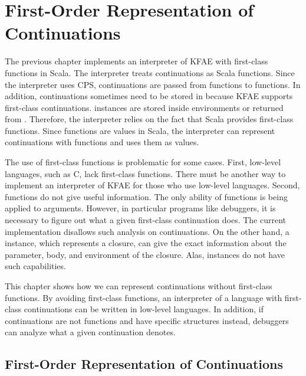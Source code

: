 \setchapterpreamble[u]{\margintoc}
\chapter{First-Order Representation of Continuations}

\renewcommand{\lang}{\textsf{KFAE}\xspace}

The previous chapter implements an interpreter of \lang with first-class
functions in Scala. The interpreter treats
continuations as Scala functions. Since the interpreter uses CPS, continuations
are passed from functions to functions. In addition, continuations sometimes need to be
stored in  because \lang supports first-class continuations.
 instances are stored inside environments or returned from
. Therefore, the interpreter relies on the fact that Scala provides
first-class functions. Since functions are values in Scala, the interpreter can
represent continuations with functions and uses them as values.

The use of first-class functions is problematic for some cases. First, low-level languages, such
as C, lack first-class functions. There must be
another way to implement an interpreter of \lang for those who use low-level languages.
Second, functions do not give useful information. The only ability of functions
is being applied to arguments. However, in particular programs like debuggers, it
is necessary to figure out what a given first-class continuation does. The
current implementation disallows such analysis on continuations. On the other
hand, a  instance, which represents a closure, can give the exact
information about the parameter, body, and environment of the closure. Alas,
 instances do not have such capabilities.

This chapter shows how we can represent continuations without
first-class functions. By avoiding first-class functions, an interpreter of a
language with first-class continuations can be written in low-level languages. In
addition, if continuations are not functions and have specific structures
instead, debuggers can analyze what a given continuation denotes.

\section{First-Order Representation of Continuations}

